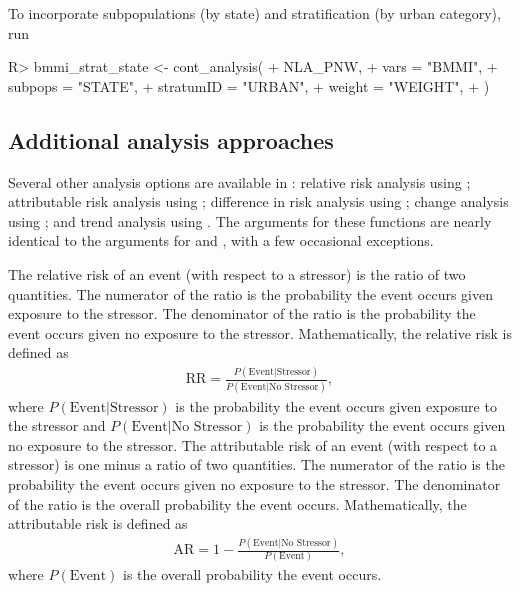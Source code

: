 \documentclass[
  shortnames]{jss}
\begin{document}
To incorporate subpopulations (by state) and stratification (by urban
category), run

\begin{CodeChunk}
\begin{CodeInput}
R> bmmi_strat_state <-  cont_analysis(
+   NLA_PNW,
+   vars = "BMMI",
+   subpops = "STATE",
+   stratumID = "URBAN",
+   weight = "WEIGHT",
+ )
\end{CodeInput}
\end{CodeChunk}

\hypertarget{additional-analysis-approaches}{%
\subsection{Additional analysis
approaches}\label{additional-analysis-approaches}}

Several other analysis options are available in : relative
risk analysis using \linebreak {}; attributable
risk analysis using ; difference in risk
analysis using ; change analysis using
; and trend analysis using
. The arguments for these functions are nearly
identical to the arguments for  and
, with a few occasional exceptions.

The relative risk of an event (with respect to a stressor) is the ratio
of two quantities. The numerator of the ratio is the probability the
event occurs given exposure to the stressor. The denominator of the
ratio is the probability the event occurs given no exposure to the
stressor. Mathematically, the relative risk is defined as
\begin{align}\label{eq:rr}
  \text{RR} = \frac{P(\text{Event} | \text{Stressor})}{P(\text{Event} | \text{No Stressor})},
\end{align} where \(P(\text{Event} | \text{Stressor})\) is the
probability the event occurs given exposure to the stressor and
\(P(\text{Event} | \text{No Stressor})\) is the probability the event
occurs given no exposure to the stressor. The attributable risk of an
event (with respect to a stressor) is one minus a ratio of two
quantities. The numerator of the ratio is the probability the event
occurs given no exposure to the stressor. The denominator of the ratio
is the overall probability the event occurs. Mathematically, the
attributable risk is defined as\\
\begin{align}\label{eq:ar}
  \text{AR} = 1 - \frac{P(\text{Event} | \text{No Stressor})}{P(\text{Event})} ,
\end{align} where \(P(\text{Event})\) is the overall probability the
event occurs.
\end{document}

